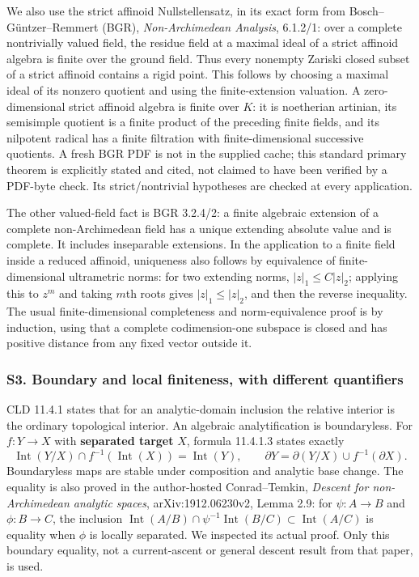 \documentclass[
  11pt,
]{article}
\begin{document}
We also use the strict affinoid Nullstellensatz, in its exact form from
Bosch--Güntzer--Remmert (BGR), \emph{Non-Archimedean Analysis}, 6.1.2/1:
over a complete nontrivially valued field, the residue field at a
maximal ideal of a strict affinoid algebra is finite over the ground
field. Thus every nonempty Zariski closed subset of a strict affinoid
contains a rigid point. This follows by choosing a maximal ideal of its
nonzero quotient and using the finite-extension valuation. A
zero-dimensional strict affinoid algebra is finite over \(K\): it is
noetherian artinian, its semisimple quotient is a finite product of the
preceding finite fields, and its nilpotent radical has a finite
filtration with finite-dimensional successive quotients. A fresh BGR PDF
is not in the supplied cache; this standard primary theorem is
explicitly stated and cited, not claimed to have been verified by a
PDF-byte check. Its strict/nontrivial hypotheses are checked at every
application.

The other valued-field fact is BGR 3.2.4/2: a finite algebraic extension
of a complete non-Archimedean field has a unique extending absolute
value and is complete. It includes inseparable extensions. In the
application to a finite field inside a reduced affinoid, uniqueness also
follows by equivalence of finite-dimensional ultrametric norms: for two
extending norms, \(|z|_1\leq C|z|_2\); applying this to \(z^m\) and
taking \(m\)th roots gives \(|z|_1\leq|z|_2\), and then the reverse
inequality. The usual finite-dimensional completeness and
norm-equivalence proof is by induction, using that a complete
codimension-one subspace is closed and has positive distance from any
fixed vector outside it.

\subsubsection{S3. Boundary and local finiteness, with different
quantifiers}\label{s3.-boundary-and-local-finiteness-with-different-quantifiers}

CLD 11.4.1 states that for an analytic-domain inclusion the relative
interior is the ordinary topological interior. An algebraic
analytification is boundaryless. For \(f:Y\to X\) with \textbf{separated
target} \(X\), formula 11.4.1.3 states exactly \[
 \operatorname{Int}(Y/X)\cap f^{-1}(\operatorname{Int}(X))
       =\operatorname{Int}(Y),\qquad
 \partial Y=\partial(Y/X)\cup f^{-1}(\partial X).
\] Boundaryless maps are stable under composition and analytic base
change. The equality is also proved in the author-hosted Conrad--Temkin,
\emph{Descent for non-Archimedean analytic spaces}, arXiv:1912.06230v2,
Lemma 2.9: for \(\psi:A\to B\) and \(\phi:B\to C\), the inclusion
\(\operatorname{Int}(A/B)\cap\psi^{-1}\operatorname{Int}(B/C)
\subset\operatorname{Int}(A/C)\) is equality when \(\phi\) is locally
separated. We inspected its actual proof. Only this boundary equality,
not a current-ascent or general descent result from that paper, is used.
\end{document}

